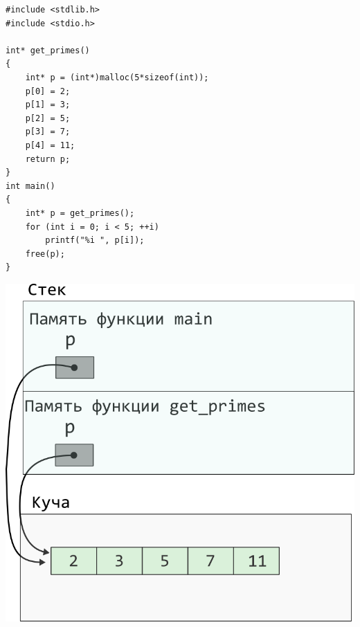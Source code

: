 \documentclass{article}
\begin{document}
\noindent\begin{minipage}{.45\textwidth}
\begin{lstlisting}
#include <stdlib.h>
#include <stdio.h>

int* get_primes() 
{
    int* p = (int*)malloc(5*sizeof(int));
    p[0] = 2;
    p[1] = 3;
    p[2] = 5;
    p[3] = 7;
    p[4] = 11;
    return p;
}
int main() 
{
    int* p = get_primes();
    for (int i = 0; i < 5; ++i)
        printf("%i ", p[i]);
    free(p);
}
\end{lstlisting}
\end{minipage}
\begin{minipage}{.45\textwidth}
\includegraphics[scale=0.9]{../images/pointer_schemes/function_return_heap_array.png}
\end{minipage}
\end{document}
